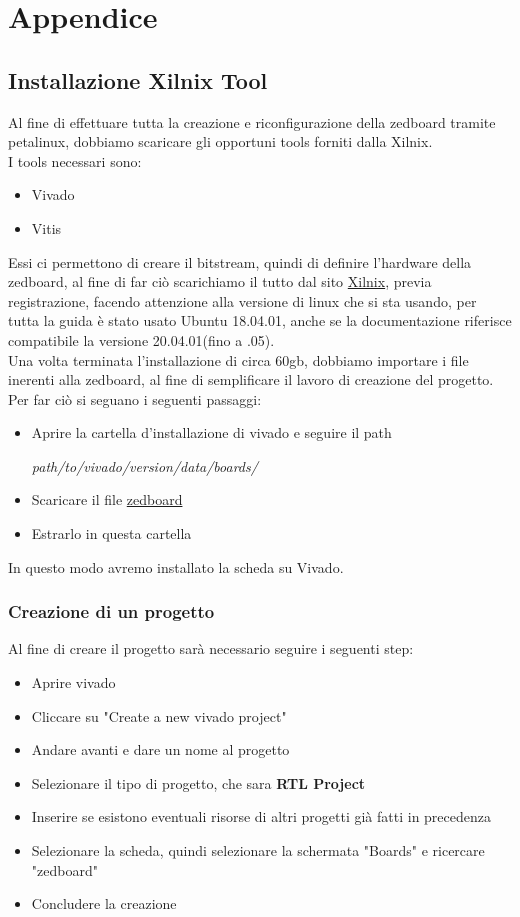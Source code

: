 \chapter{Appendice}

\section{Installazione Xilnix Tool}
\label{app:a}
Al fine di effettuare tutta la creazione e riconfigurazione della zedboard tramite petalinux, dobbiamo scaricare gli opportuni tools forniti dalla Xilnix.\\
I tools necessari sono:
\begin{itemize}
\item Vivado
\item Vitis
\end{itemize}
Essi ci permettono di creare il bitstream, quindi di definire l'hardware della zedboard, al fine di far ciò scarichiamo il tutto dal sito \href{https://www.xilinx.com/support/download/index.html/content/xilinx/en/downloadNav/vivado-design-tools.html}{Xilnix}, previa registrazione, facendo attenzione alla versione di linux che si sta usando, per tutta la guida è stato usato Ubuntu 18.04.01, anche se la documentazione riferisce compatibile la versione 20.04.01(fino a .05).\\
Una volta terminata l'installazione di circa 60gb, dobbiamo importare i file inerenti alla zedboard, al fine di semplificare il lavoro di creazione del progetto. Per far ciò si seguano i seguenti passaggi:
\begin{itemize}
\item Aprire la cartella d'installazione di vivado e seguire il path
\begin{center}
\textit{path/to/vivado/version/data/boards/}
\end{center}
\item Scaricare il file \href{https://github.com/Digilent/vivado-boards/archive/master.zip}{zedboard}
\item Estrarlo in questa cartella
\end{itemize}
In questo modo avremo installato la scheda su Vivado.
\subsection{Creazione di un progetto}
\label{CreazioneVivado}
Al fine di creare il progetto sarà necessario seguire i seguenti step:
\begin{itemize}
\item Aprire vivado
\item Cliccare su "Create a new vivado project"
\item Andare avanti e dare un nome al progetto
\item Selezionare il tipo di progetto, che sara \textbf{RTL Project}
\item Inserire se esistono eventuali risorse di altri progetti già fatti in precedenza
\item Selezionare la scheda, quindi selezionare la schermata "Boards" e ricercare "zedboard"
\item Concludere la creazione
\end{itemize}
